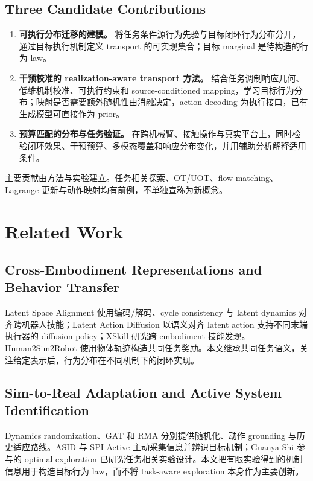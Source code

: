 \documentclass[11pt]{article}
\begin{document}
\subsection{Three Candidate Contributions}
\begin{enumerate}[label=\textbf{C\arabic*.}]
\item \textbf{可执行分布迁移的建模。} 将任务条件源行为先验与目标闭环行为分布分开，通过目标执行机制定义 transport 的可实现集合；目标 marginal 是待构造的行为 law。
\item \textbf{干预校准的 realization-aware transport 方法。} 结合任务调制响应几何、低维机制校准、可执行约束和 source-conditioned mapping，学习目标行为分布；映射是否需要额外随机性由消融决定，action decoding 为执行接口，已有生成模型可直接作为 prior。
\item \textbf{预算匹配的分布与任务验证。} 在跨机械臂、接触操作与真实平台上，同时检验闭环效果、干预预算、多模态覆盖和响应分布变化，并用辅助分析解释适用条件。
\end{enumerate}
主要贡献由方法与实验建立。任务相关探索、OT/UOT、flow matching、Lagrange 更新与动作映射均有前例，不单独宣称为新概念。

\section{Related Work}
\label{sec:related}
\subsection{Cross-Embodiment Representations and Behavior Transfer}
Latent Space Alignment 使用编码/解码、cycle consistency 与 latent dynamics 对齐跨机器人技能\cite{lsa}；Latent Action Diffusion 以语义对齐 latent action 支持不同末端执行器的 diffusion policy\cite{lad}；XSkill 研究跨 embodiment 技能发现\cite{xskill}。Human2Sim2Robot 使用物体轨迹构造共同任务奖励\cite{human2sim}。本文继承共同任务语义，关注给定表示后，行为分布在不同机制下的闭环实现。

\subsection{Sim-to-Real Adaptation and Active System Identification}
Dynamics randomization、GAT 和 RMA 分别提供随机化、动作 grounding 与历史适应路线\cite{dr,gat,rma}。ASID 与 SPI-Active 主动采集信息并辨识目标机制\cite{asid,spi}；Guanya Shi 参与的 optimal exploration 已研究任务相关实验设计\cite{optimalexploration}。本文把有限实验得到的机制信息用于构造目标行为 law，而不将 task-aware exploration 本身作为主要创新。
\end{document}
